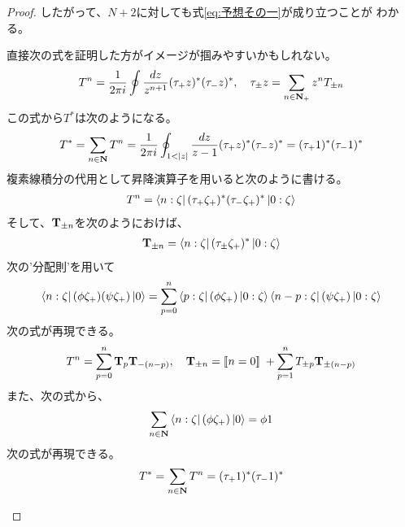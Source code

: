 {\begin{proof}
		したがって、$N+2$に対しても式\eqref{eq:予想その一}が成り立つことが
		わかる。
		\begin{todo}[メモ]\label{todo:メモ} %
			直接次の式を証明した方がイメージが掴みやすいかもしれない。
			\begin{equation*}\begin{split}
				T^n = \frac{1}{2\pi i}\oint \frac{dz}{z^{n+1}}
					(\tau_+z)^*(\tau_-z)^*,\quad
				\tau_\pm z = \sum_{n\in\mathbf{N}_+} z^nT_{\pm n}
			\end{split}\end{equation*}
			この式から$T^*$は次のようになる。
			\begin{equation*}\begin{split}
				T^* = \sum_{n\in\sizen}T^n
				= \frac{1}{2\pi i}\oint_{1<|z|} \frac{dz}{z-1}
					(\tau_+z)^*(\tau_-z)^*
				= (\tau_+1)^*(\tau_-1)^*
			\end{split}\end{equation*}
			複素線積分の代用として昇降演算子を用いると次のように書ける。
			\begin{equation*}\begin{split}
				T^n = \mathinner{\langle{n:\zeta}|}(\tau_+\zeta_+)^*(\tau_-\zeta_+)^*\mathinner{|{0:\zeta}\rangle}
			\end{split}\end{equation*}
			そして、${\mathbf{T}}_{\pm n}$を次のようにおけば、
			\begin{equation*}\begin{split}
				{\ensuremath{\mathbf{T}}}_{\pm n} = \mathinner{\langle{n:\zeta}|}(\tau_\pm\zeta_+)^*\mathinner{|{0:\zeta}\rangle}
			\end{split}\end{equation*}
			次の'分配則'を用いて
			\begin{equation*}\begin{split}
				\mathinner{\langle{n:\zeta}|}(\phi\zeta_+)(\psi\zeta_+)\mathinner{|{0}\rangle}
				= \sum_{p=0}^n \mathinner{\langle{p:\zeta}|}(\phi\zeta_+)\mathinner{|{0:\zeta}\rangle}
					\mathinner{\langle{n-p:\zeta}|}(\psi\zeta_+)\mathinner{|{0:\zeta}\rangle}
			\end{split}\end{equation*}
			次の式が再現できる。
			\begin{equation*}\begin{split}
				T^n = \sum_{p=0}^n {\mathbf{T}}_{p}{\mathbf{T}}_{-(n-p)},\quad
				{\ensuremath{\mathbf{T}}}_{\pm n} = [\![n=0]\!]\; 
					+ \sum_{p=1}^n T_{\pm p}{\mathbf{T}}_{\pm(n-p)}
			\end{split}\end{equation*}
			また、次の式から、
			\begin{equation*}\begin{split}
				\sum_{n\in\mathbf{N}}\mathinner{\langle{n:\zeta}|}(\phi\zeta_+)\mathinner{|{0}\rangle} = \phi1
			\end{split}\end{equation*}
			次の式が再現できる。
			\begin{equation*}\begin{split}
				T^* = \sum_{n\in\mathbf{N}} T^n = (\tau_+1)^*(\tau_-1)^*
			\end{split}\end{equation*}


\end{todo}
\end{proof}}
